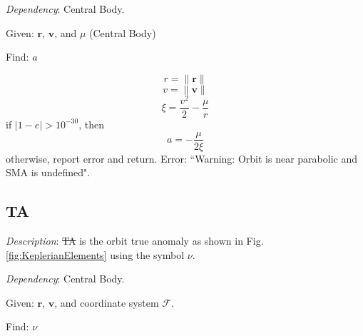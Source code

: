 \noindent \textit{Dependency}:  Central Body.

\noindent Given:  $\mathbf{r}$, $\mathbf{v}$, and $\mu$ (Central
Body)

\noindent Find:  $a$


%
\begin{equation}
    r = \| \mathbf{r} \|
\end{equation}
%
\begin{equation}
    v = \| \mathbf{v} \|
\end{equation}
%
\begin{equation}
     \xi = \frac{v^2}{2} - \frac{\mu}{r}
\end{equation}
%
if $|1 - e| > 10^{-30}$, then
\begin{equation}
     a = -\frac{\mu}{2\xi}
\end{equation}
%
otherwise, report  error and return.  Error: ``Warning: Orbit is
near parabolic and SMA is undefined".

\subsection{TA} 

\noindent \textit{Description}: \st{TA} is the orbit true anomaly as
shown in Fig. \ref{fig:KeplerianElements} using the symbol $\nu$.

\noindent \textit{Dependency}:  Central Body.

\noindent Given:  $\mathbf{r}$, $\mathbf{v}$, and coordinate system
$\mathcal{F}$.

\noindent Find:  $\nu$

